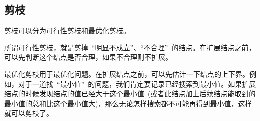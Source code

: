 \subsection{剪枝}
	剪枝可以分为可行性剪枝和最优化剪枝。
	
	所谓可行性剪枝，就是剪掉~``明显不成立''、``不合理''~的结点。在扩展结点之前，可以先判断这个结点是否合理，如果不合理则不扩展。
	
	最优化剪枝用于最优化问题。在扩展结点之前，可以先估计一下结点的上下界。例如，对于一道找~``最小值''~的问题，我们肯定要记录已经搜索到最小值。如果扩展结点的时候发现结点的值已经大于这个最小值~(或者此结点加上后续结点能取到的最小值的总和比这个最小值大)，那么无论怎样搜索都不可能再得到最小值，这样就可以剪枝了。